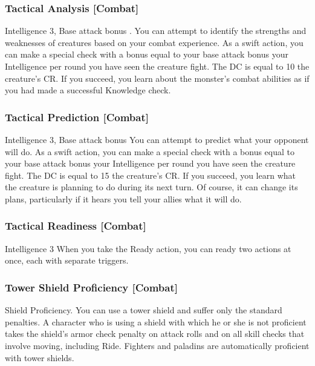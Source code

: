 \subsubsection{Tactical Analysis [Combat]}
 Intelligence 3, Base attack bonus .
 You can attempt to identify the strengths and weaknesses of creatures based on your combat experience. As a swift action, you can make a special check with a bonus equal to your base attack bonus \add your Intelligence  per round you have seen the creature fight. The DC is equal to 10 \add the creature's CR. If you succeed, you learn about the monster's combat abilities as if you had made a successful Knowledge check.

\subsubsection{Tactical Prediction [Combat]}
 Intelligence 3, Base attack bonus 
 You can attempt to predict what your opponent will do. As a swift action, you can make a special check with a bonus equal to your base attack bonus \add your Intelligence  per round you have seen the creature fight. The DC is equal to 15 \add the creature's CR. If you succeed, you learn what the creature is planning to do during its next turn. Of course, it can change its plans, particularly if it hears you tell your allies what it will do.

\subsubsection{Tactical Readiness [Combat]}
 Intelligence 3
 When you take the Ready action, you can ready two actions at once, each with separate triggers.

\subsubsection{Tower Shield Proficiency [Combat]}
 Shield Proficiency.
 You can use a tower shield and suffer only the standard penalties.
 A character who is using a shield with which he or she is not proficient takes the shield's armor check penalty on attack rolls and on all skill checks that involve moving, including Ride.
 Fighters and paladins are automatically proficient with tower shields.

